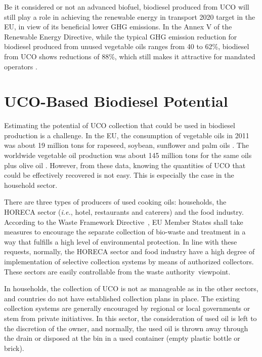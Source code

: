 \documentclass[sustainability,article,accept,moreauthors,pdftex,12pt,a4paper]{mdpi}
\begin{document}
Be it considered or not an advanced biofuel, biodiesel produced from UCO will still play a role in achieving the renewable energy in transport 2020 target in the EU, in view of its beneficial lower GHG emissions. In the Annex V of the Renewable Energy Directive, while the typical GHG emission reduction for biodiesel produced from unused vegetable oils ranges from 40 to 62\%, biodiesel from UCO shows reductions of 88\%, which still makes it attractive for mandated operators \cite{Directive2009/28/EC}.


\section{UCO-Based Biodiesel Potential}

Estimating the potential of UCO collection that could be used in biodiesel production is a challenge. In the EU, the consumption of vegetable oils in 2011 was about 19 million tons for rapeseed, soybean, sunflower and palm oils \cite{Fediol2013}. The worldwide vegetable oil production was about 145 million tons for the same oils plus olive oil \cite{USDAonline}. However, from these data, knowing the quantities of UCO that could be effectively recovered is not easy. This is especially the case in the household sector.

There are three types of producers of used cooking oils: households, the HORECA sector (\textit{i.e.}, hotel, restaurants and caterers) and the food industry. According to the Waste Framework Directive~\cite{Directive2008/98/EC}, EU Member States shall take measures to encourage the separate collection of bio-waste and treatment in a way that fulfills a high level of environmental protection. In line with these requests, normally, the HORECA sector and food industry have a high degree of implementation of selective collection systems by means of authorized collectors. These sectors are easily controllable from the waste \mbox{authority viewpoint.}

In households, the collection of UCO is not as manageable as in the other sectors, and countries do not have established collection plans in place. The existing collection systems are generally encouraged by regional or local governments or stem from private initiatives. In this sector, the consideration of used oil is left to the discretion of the owner, and normally, the used oil is thrown away through the drain or disposed at the bin in a used container (empty plastic bottle or brick).
\end{document}
